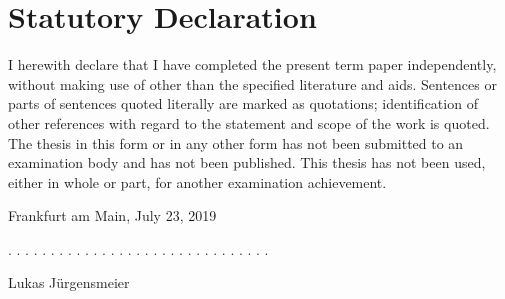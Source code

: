 \documentclass[12pt,a4paper]{article}
\begin{document}
\clearpage
%

\newpage
\thispagestyle{empty}
\section*{Statutory Declaration}

I herewith declare that I have completed the present term paper independently, without making use of
other than the specified literature and aids. Sentences or parts of sentences quoted literally are
marked as quotations; identification of other references with regard to the statement and scope of
the work is quoted. The thesis in this form or in any other form has not been submitted to an examination body and has not been published.
This thesis has not been used, either in whole or part, for another examination achievement.

\vspace{1cm}

Frankfurt am Main, July 23, 2019
\vspace{2cm}

. . . . . . . . . . . . . . . . . . . . . . . . . . . . . . .
\vspace{0.1cm}

Lukas J\"urgensmeier
\end{document}
